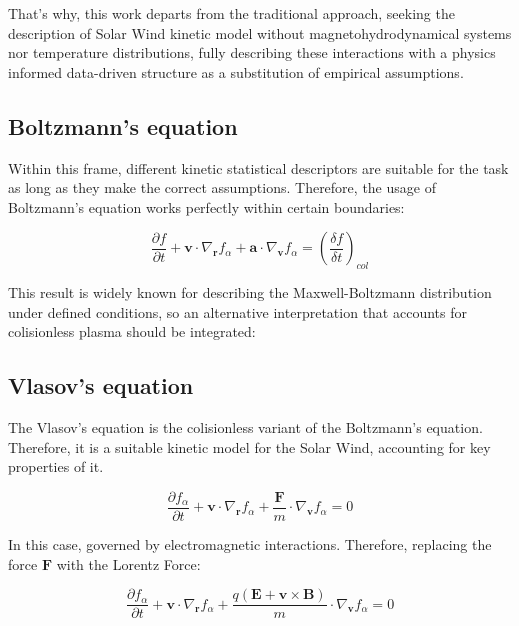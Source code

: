 \documentclass[12pt]{article}
\begin{document}
That's why, this work departs from the traditional approach, seeking the description of Solar Wind kinetic model without magnetohydrodynamical systems nor temperature distributions, fully describing these interactions with a physics informed data-driven structure as a substitution of empirical assumptions.

\subsection{Boltzmann's equation}
Within this frame, different kinetic statistical descriptors are suitable for the task as long as they make the correct assumptions. Therefore, the usage of Boltzmann's equation works perfectly within certain boundaries:

\begin{equation}
    \frac{\partial f}{\partial t} + \mathbf{v} \cdot \nabla_{\mathbf{r}} f_\alpha + \mathbf{a} \cdot \nabla_{\mathbf{v}} f_\alpha= \left(\frac{\delta f}{\delta t}\right)_{col}
\end{equation}

This result is widely known for describing the Maxwell-Boltzmann distribution under defined conditions, so an alternative interpretation that accounts for colisionless plasma should be integrated:

\subsection{Vlasov's equation}
The Vlasov's equation is the colisionless variant of the Boltzmann's equation. Therefore, it is a  suitable kinetic model for the Solar Wind, accounting for key properties of it.

\begin{equation}
    \frac{\partial f_{\alpha}}{\partial t} + \mathbf{v} \cdot \nabla_{\mathbf{r}}  f_{\alpha} + \frac{\mathbf{F}}{m} \cdot \nabla_{\mathbf{v}} f_\alpha = 0
\end{equation}

In this case, governed by electromagnetic interactions. Therefore, replacing the force $\mathbf{F}$ with the Lorentz Force:

\begin{equation}
    \frac{\partial f_{\alpha}}{\partial t} + \mathbf{v} \cdot \nabla_{\mathbf{r}}  f_{\alpha} + \frac{q (\mathbf{E} + \mathbf{v} \times \mathbf{B})}{m} \cdot \nabla_{\mathbf{v}} f_\alpha = 0
\end{equation}
\end{document}
